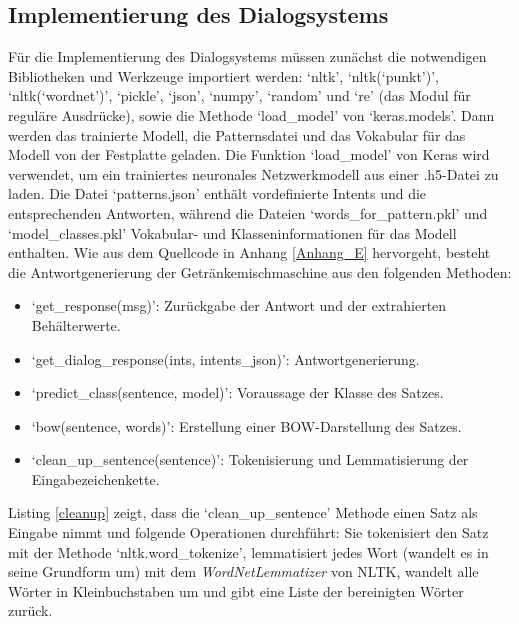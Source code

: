 \subsection{Implementierung des Dialogsystems}
Für die Implementierung des Dialogsystems müssen zunächst die notwendigen Bibliotheken und Werkzeuge importiert werden: `nltk', `nltk(`punkt')', `nltk(`wordnet')', `pickle', `json', `numpy', `random' und `re' (das Modul für reguläre Ausdrücke), sowie die Methode `load\_model' von `keras.models'.
Dann werden das trainierte Modell, die Patternsdatei und das Vokabular für das Modell von der Festplatte geladen. 
Die Funktion `load\_model' von Keras wird verwendet, um ein trainiertes neuronales Netzwerkmodell aus einer .h5-Datei zu laden. 
Die Datei `patterns.json' enthält vordefinierte Intents und die entsprechenden Antworten, während die Dateien `words\_for\_pattern.pkl' und `model\_classes.pkl' Vokabular- und Klasseninformationen für das Modell enthalten.
Wie aus dem Quellcode in Anhang \ref{Anhang_E} hervorgeht, besteht die Antwortgenerierung der Getränkemischmaschine aus den folgenden Methoden:
\begin{itemize}
    \item `get\_response(msg)': Zurückgabe der Antwort und der extrahierten Behälterwerte.
    \item `get\_dialog\_response(ints, intents\_json)': Antwortgenerierung.
    \item `predict\_class(sentence, model)': Voraussage der Klasse des Satzes.
    \item `bow(sentence, words)': Erstellung einer \ac{BOW}-Darstellung des Satzes.
    \item `clean\_up\_sentence(sentence)': Tokenisierung und Lemmatisierung der Eingabezeichenkette.
\end{itemize}

Listing \ref{cleanup} zeigt, dass die `clean\_up\_sentence' Methode einen Satz als Eingabe nimmt und folgende Operationen durchführt: 
Sie tokenisiert den Satz mit der Methode `nltk.word\_tokenize', lemmatisiert jedes Wort (wandelt es in seine Grundform um) mit dem \textit{WordNetLemmatizer} von \ac{NLTK}, wandelt alle Wörter in Kleinbuchstaben um und gibt eine Liste der bereinigten Wörter zurück.\\

